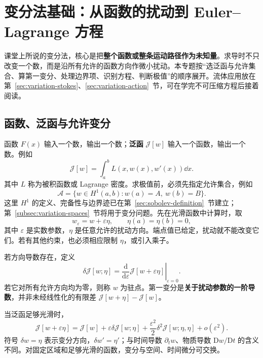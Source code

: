 \section{变分法基础：从函数的扰动到 Euler--Lagrange 方程}\label{sec:variation-foundations}

课堂上所说的变分法，核心是把\textbf{整个函数或整条运动路径作为未知量}。求导时不只改变一个数，而是沿所有允许的函数方向作微小扰动。本专题按“选泛函与允许集合、算第一变分、处理边界项、识别方程、判断极值”的顺序展开。流体应用放在第~\ref{sec:variation-stokes}、\ref{sec:variation-action}~节，可在学完不可压缩方程后接着阅读。

\subsection{函数、泛函与允许变分}

函数 $F(x)$ 输入一个数，输出一个数；\textbf{泛函} $\mathcal J[w]$ 输入一个函数，输出一个数。例如
\begin{equation}
 \mathcal J[w]=\int_a^b L(x,w(x),w'(x))\dd x.
\end{equation}
其中 $L$ 称为被积函数或 Lagrange 密度。求极值前，必须先指定允许集合，例如
\begin{equation}
 \mathcal A=\{w\in H^1(a,b):w(a)=A,\ w(b)=B\}.
\end{equation}
这里 $H^1$ 的定义、完备性与边界迹已在第~\ref{sec:sobolev-definition}~节建立；第~\ref{subsec:variation-spaces}~节将用于变分问题。先在光滑函数中计算时，取
\begin{equation}
 w_\varepsilon=w+\varepsilon\eta,\qquad
 \eta(a)=\eta(b)=0,
\end{equation}
其中 $\varepsilon$ 是实数参数，$\eta$ 是任意允许的扰动方向。端点值已给定，扰动就不能改变它们。若有其他约束，也必须相应限制 $\eta$，或引入乘子。

\begin{definition}[第一变分与驻点]
若方向导数存在，定义
\begin{equation}
 \boxed{\delta\mathcal J[w;\eta]
 =\left.\frac{\mathrm d}{\mathrm d\varepsilon}
 \mathcal J[w+\varepsilon\eta]\right|_{\varepsilon=0}.}
 \label{eq:first-variation}
\end{equation}
若它对所有允许方向均为零，则称 $w$ 为驻点。第一变分是\textbf{关于扰动参数的一阶导数}，并非未经线性化的有限差 $\mathcal J[w+\eta]-\mathcal J[w]$。
\end{definition}

当泛函足够光滑时，
\begin{equation}
 \mathcal J[w+\varepsilon\eta]
 =\mathcal J[w]+\varepsilon\delta\mathcal J[w;\eta]
 +\frac{\varepsilon^2}{2}\delta^2\mathcal J[w;\eta,\eta]
 +o(\varepsilon^2).
\end{equation}
符号 $\delta w=\eta$ 表示变分方向，$\delta w'=\eta'$；与时间导数 $\partial_tw$、物质导数 $\mathrm Dw/\mathrm Dt$ 的含义不同。对固定区域和足够光滑的函数，变分与空间、时间微分可交换。


